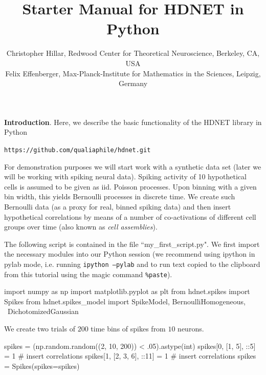 \documentclass[letter, 12pt]{article}
\theoremstyle{definition}
\theoremstyle{remark}
\begin{document}
\title{Starter Manual for HDNET in Python}
\author{\normalsize Christopher Hillar, Redwood Center for Theoretical Neuroscience, Berkeley, CA, USA\\
\normalsize Felix Effenberger, Max-Planck-Institute for Mathematics in the Sciences, Leipzig, Germany
}
\date{}



\maketitle

\textbf{Introduction}.  Here, we describe the basic functionality of the HDNET library in Python

\begin{center}
\texttt{https://github.com/qualiaphile/hdnet.git} \\
\end{center}

For demonstration purposes we will start work with a synthetic data set  (later we will be working with spiking neural data). Spiking activity of 10 hypothetical cells is assumed to be given as iid. Poisson processes. Upon binning with a given bin width, this yields Bernoulli processes in discrete time. We create such Bernoulli data (as a proxy for real, binned spiking data) and then insert hypothetical correlations by means of a number of co-activations of different cell groups over time (also known as \textit{cell assemblies}).

The following script is contained in the file ``my\_first\_script.py".  We first import the necessary modules into our Python session (we recommend using ipython in pylab mode, i.e. running \texttt{ipython --pylab} and to run text copied to the clipboard from this tutorial using the magic command \texttt{\%paste}).

\begin{python}
import numpy as np
import matplotlib.pyplot as plt
from hdnet.spikes import Spikes
from hdnet.spikes_model import SpikeModel, BernoulliHomogeneous, \
	DichotomizedGaussian
\end{python}

We create two trials of $200$ time bins of spikes from $10$ neurons.

\begin{python}
spikes = (np.random.random((2, 10, 200)) < .05).astype(int)
spikes[0, [1, 5], ::5] = 1 # insert correlations
spikes[1, [2, 3, 6], ::11] = 1  # insert correlations
spikes = Spikes(spikes=spikes)
\end{python}
\end{document}
